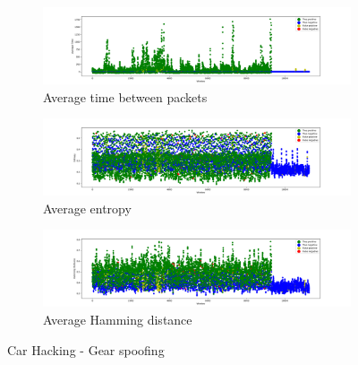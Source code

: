 \begin{figure}
    \centering
    \begin{subfigure}[b]{\linewidth}
        \includegraphics[width = \linewidth]{img/parts/app/tests/car_hacking/gear/AvgTime.png}
        \caption{Average time between packets}
        \label{subfig:extract_carhacking_gear_avgtime}
    \end{subfigure}
    \begin{subfigure}[b]{\linewidth}
        \includegraphics[width = \linewidth]{img/parts/app/tests/car_hacking/gear/Entropy.png}
        \caption{Average entropy}
        \label{subfig:extract_carhacking_gear_entropy}
    \end{subfigure}
    \begin{subfigure}[b]{\linewidth}
        \includegraphics[width = \linewidth]{img/parts/app/tests/car_hacking/gear/HammingDist.png}
        \caption{Average Hamming distance}
        \label{subfig:extract_carhacking_gear_hammingdist}
    \end{subfigure}
    \caption{Car Hacking - Gear spoofing}
    \label{fig:extract_carhacking_gear}
\end{figure}

